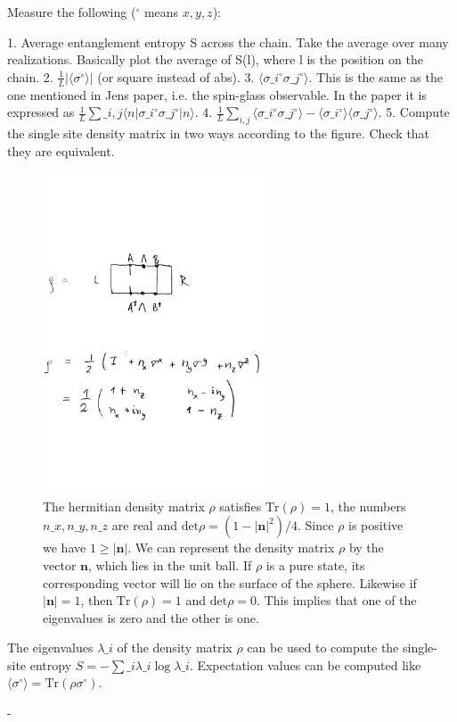 \documentclass[a4paper]{article}
\begin{document}
\begin{markdown}
	
	 Measure the following ($^\circ$ means $x,y,z$):
	 
	1. Average entanglement entropy S across the chain. Take the average over many realizations. Basically plot the average of S(l), where l is the position on the chain.
	2. $\frac{1}{L}|\langle \sigma^\circ \rangle|$ (or square instead of abs).
	3. $\langle\sigma\_i^\circ\sigma\_j^\circ \rangle$. This is the same as the one mentioned in Jens paper, i.e. the spin-glass observable. In the paper it is expressed as $\frac{1}{L} \sum\_{i,j} \langle n | \sigma\_i^\circ \sigma\_j^\circ | n \rangle $.
	4. $\frac{1}{L}\sum_{i,j} \langle  \sigma\_i^\circ \sigma\_j^\circ \rangle - \langle \sigma\_i^\circ \rangle \langle\sigma\_j^\circ \rangle $.
	5. Compute the single site density matrix in two ways according to the figure. Check that they are equivalent.
	\begin{figure}[h!]
		\centering
		\includegraphics[width=0.6\textwidth]{figures/densitymatrix.pdf}
		\caption{The hermitian density matrix $\rho$ satisfies $\mathrm{Tr}(\rho) = 1$, the numbers $n\_x,n\_y,n\_z$ are real and $\mathrm{det}\rho = (1-|\mathbf{n}|^2)/4$. Since $\rho$ is positive we have $1\geq |\mathbf{n}|$. We can represent the density matrix $\rho$ by the vector $\mathbf{n}$, which lies in the unit ball. If $\rho$ is a pure state, its corresponding vector will lie on the surface of the sphere. Likewise if $|\mathbf{n}|=1$, then $\mathrm{Tr}(\rho) = 1$ and $\mathrm{det} \rho = 0$. This implies that one of the eigenvalues is zero and the other is one.}
	\end{figure}
		The eigenvalues $\lambda\_i$ of the density matrix $\rho$ can be used to compute the single-site entropy $S = -\sum\_i \lambda\_i \log \lambda\_i$.  Expectation values can be computed like $\langle \sigma^\circ \rangle = \mathrm{Tr}(\rho\sigma^\circ)$.

	- 
\end{markdown}

		

 
\end{document}
